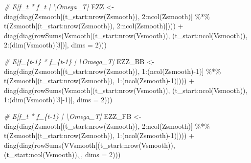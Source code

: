 \documentclass[
]{article}
\newenvironment{Shaded}{\begin{snugshade}}{\end{snugshade}}
\newcommand{\AttributeTok}[1]{\textcolor[rgb]{0.77,0.63,0.00}{#1}}
\newcommand{\CommentTok}[1]{\textcolor[rgb]{0.56,0.35,0.01}{\textit{#1}}}
\newcommand{\DecValTok}[1]{\textcolor[rgb]{0.00,0.00,0.81}{#1}}
\newcommand{\FunctionTok}[1]{\textcolor[rgb]{0.00,0.00,0.00}{#1}}
\newcommand{\NormalTok}[1]{#1}
\newcommand{\OtherTok}[1]{\textcolor[rgb]{0.56,0.35,0.01}{#1}}
\newcommand{\SpecialCharTok}[1]{\textcolor[rgb]{0.00,0.00,0.00}{#1}}
\begin{document}
\begin{Shaded}
\begin{Highlighting}[]
  \CommentTok{\# E[f\_t * f\_t\textquotesingle{} | \textbackslash{}Omega\_T]}
\NormalTok{  EZZ }\OtherTok{\textless{}{-}} \FunctionTok{diag}\NormalTok{(}\FunctionTok{diag}\NormalTok{(Zsmooth[(t\_start}\SpecialCharTok{:}\FunctionTok{nrow}\NormalTok{(Zsmooth)), }\DecValTok{2}\SpecialCharTok{:}\FunctionTok{ncol}\NormalTok{(Zsmooth)] }\SpecialCharTok{\%*\%} \FunctionTok{t}\NormalTok{(Zsmooth[(t\_start}\SpecialCharTok{:}\FunctionTok{nrow}\NormalTok{(Zsmooth)), }\DecValTok{2}\SpecialCharTok{:}\FunctionTok{ncol}\NormalTok{(Zsmooth)]))) }\SpecialCharTok{+} 
    \FunctionTok{diag}\NormalTok{(}\FunctionTok{diag}\NormalTok{(}\FunctionTok{rowSums}\NormalTok{(Vsmooth[(t\_start}\SpecialCharTok{:}\FunctionTok{nrow}\NormalTok{(Vsmooth)), (t\_start}\SpecialCharTok{:}\FunctionTok{ncol}\NormalTok{(Vsmooth)), }\DecValTok{2}\SpecialCharTok{:}\NormalTok{(}\FunctionTok{dim}\NormalTok{(Vsmooth)[}\DecValTok{3}\NormalTok{])], }\AttributeTok{dims =} \DecValTok{2}\NormalTok{)))}
  
  \CommentTok{\# E[f\_\{t{-}1\} * f\_\{t{-}1\}\textquotesingle{} | \textbackslash{}Omega\_T]}
\NormalTok{  EZZ\_BB }\OtherTok{\textless{}{-}} \FunctionTok{diag}\NormalTok{(}\FunctionTok{diag}\NormalTok{(Zsmooth[(t\_start}\SpecialCharTok{:}\FunctionTok{nrow}\NormalTok{(Zsmooth)), }\DecValTok{1}\SpecialCharTok{:}\NormalTok{(}\FunctionTok{ncol}\NormalTok{(Zsmooth)}\SpecialCharTok{{-}}\DecValTok{1}\NormalTok{)] }\SpecialCharTok{\%*\%} \FunctionTok{t}\NormalTok{(Zsmooth[(t\_start}\SpecialCharTok{:}\FunctionTok{nrow}\NormalTok{(Zsmooth)), }\DecValTok{1}\SpecialCharTok{:}\NormalTok{(}\FunctionTok{ncol}\NormalTok{(Zsmooth)}\SpecialCharTok{{-}}\DecValTok{1}\NormalTok{)]))) }\SpecialCharTok{+} 
    \FunctionTok{diag}\NormalTok{(}\FunctionTok{diag}\NormalTok{(}\FunctionTok{rowSums}\NormalTok{(Vsmooth[(t\_start}\SpecialCharTok{:}\FunctionTok{nrow}\NormalTok{(Vsmooth)), (t\_start}\SpecialCharTok{:}\FunctionTok{ncol}\NormalTok{(Vsmooth)), }\DecValTok{1}\SpecialCharTok{:}\NormalTok{(}\FunctionTok{dim}\NormalTok{(Vsmooth)[}\DecValTok{3}\NormalTok{]}\SpecialCharTok{{-}}\DecValTok{1}\NormalTok{)], }\AttributeTok{dims =} \DecValTok{2}\NormalTok{)))}
  
  \CommentTok{\# E[f\_t * f\_\{t{-}1\}\textquotesingle{} | \textbackslash{}Omega\_T]}
\NormalTok{  EZZ\_FB }\OtherTok{\textless{}{-}} \FunctionTok{diag}\NormalTok{(}\FunctionTok{diag}\NormalTok{(Zsmooth[(t\_start}\SpecialCharTok{:}\FunctionTok{nrow}\NormalTok{(Zsmooth)), }\DecValTok{2}\SpecialCharTok{:}\FunctionTok{ncol}\NormalTok{(Zsmooth)] }\SpecialCharTok{\%*\%} \FunctionTok{t}\NormalTok{(Zsmooth[(t\_start}\SpecialCharTok{:}\FunctionTok{nrow}\NormalTok{(Zsmooth)), }\DecValTok{1}\SpecialCharTok{:}\NormalTok{(}\FunctionTok{ncol}\NormalTok{(Zsmooth)}\SpecialCharTok{{-}}\DecValTok{1}\NormalTok{)]))) }\SpecialCharTok{+} 
    \FunctionTok{diag}\NormalTok{(}\FunctionTok{diag}\NormalTok{(}\FunctionTok{rowSums}\NormalTok{(VVsmooth[(t\_start}\SpecialCharTok{:}\FunctionTok{nrow}\NormalTok{(Vsmooth)), (t\_start}\SpecialCharTok{:}\FunctionTok{ncol}\NormalTok{(Vsmooth)),], }\AttributeTok{dims =} \DecValTok{2}\NormalTok{)))}
  

\end{Highlighting}
\end{Shaded}
\end{document}
